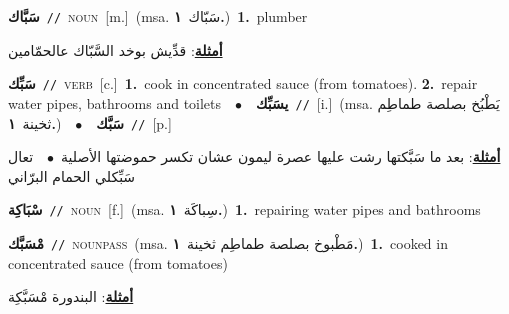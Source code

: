 \documentclass[10pt,a4paper,twoside]{article} %
\begin{document}
\begin{multicols}{2}
{{{{{{{{{{\setlength\topsep{0pt}\textbf{\foreignlanguage{arabic}{سَبَّاك}}\ {\color{gray}\texttt{//}\color{black}}\ \textsc{noun}\ [m.]\ \color{gray}(msa. \foreignlanguage{arabic}{سَبّاك}~\foreignlanguage{arabic}{\textbf{١.}})\color{black}\ \textbf{1.}~plumber\  \begin{flushright}\color{gray}\foreignlanguage{arabic}{\textbf{\underline{\foreignlanguage{arabic}{أمثلة}}}: قدِّيش بوخد السَّبّاك عالحمّامين}\end{flushright}\color{black}} \vspace{2mm}

{\setlength\topsep{0pt}\textbf{\foreignlanguage{arabic}{سَبِّك}}\ {\color{gray}\texttt{//}\color{black}}\ \textsc{verb}\ [c.]\ \textbf{1.}~cook in concentrated sauce (from tomatoes).  \textbf{2.}~repair water pipes, bathrooms and toilets\ \ $\bullet$\ \ \setlength\topsep{0pt}\textbf{\foreignlanguage{arabic}{يسَبِّك}}\ {\color{gray}\texttt{//}\color{black}}\ [i.]\ \color{gray}(msa. \foreignlanguage{arabic}{يَطْبُخ بصلصة طماطِم ثخينة}~\foreignlanguage{arabic}{\textbf{١.}})\color{black}\ \ $\bullet$\ \ \setlength\topsep{0pt}\textbf{\foreignlanguage{arabic}{سَبَّك}}\ {\color{gray}\texttt{//}\color{black}}\ [p.]\  \begin{flushright}\color{gray}\foreignlanguage{arabic}{\textbf{\underline{\foreignlanguage{arabic}{أمثلة}}}: بعد ما سَبَّكتها رشت عليها عصرة ليمون عشان تكسر حموضتها الأصلية\ $\bullet$\ \  تعال سَبِّكلي الحمام البرّاني}\end{flushright}\color{black}} \vspace{2mm}

{\setlength\topsep{0pt}\textbf{\foreignlanguage{arabic}{سْبَاكِة}}\ {\color{gray}\texttt{//}\color{black}}\ \textsc{noun}\ [f.]\ \color{gray}(msa. \foreignlanguage{arabic}{سِباكَة}~\foreignlanguage{arabic}{\textbf{١.}})\color{black}\ \textbf{1.}~repairing water pipes and bathrooms\ 

{\setlength\topsep{0pt}\textbf{\foreignlanguage{arabic}{مْسَبَّك}}\ {\color{gray}\texttt{//}\color{black}}\ \textsc{noun\textunderscore pass}\ \color{gray}(msa. \foreignlanguage{arabic}{مَطْبوخ بصلصة طماطِم ثخينة}~\foreignlanguage{arabic}{\textbf{١.}})\color{black}\ \textbf{1.}~cooked in concentrated sauce (from tomatoes)\  \begin{flushright}\color{gray}\foreignlanguage{arabic}{\textbf{\underline{\foreignlanguage{arabic}{أمثلة}}}: البندورة مْسَبَّكِة}\end{flushright}\color{black}} \vspace{2mm}

}}}}}}}}}}
\end{multicols}
\end{document}
